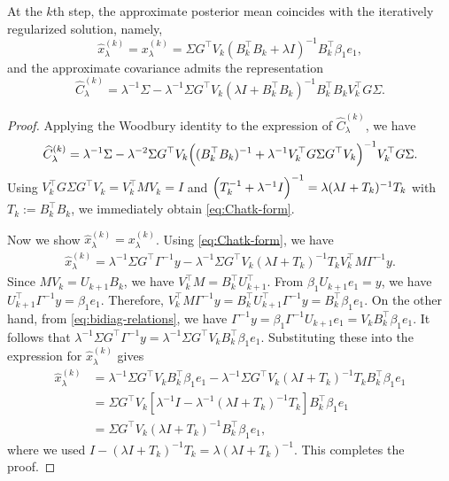 \documentclass[]{myarticle}
\begin{document}
\begin{proposition}\label{prop:approx_post}
At the $k$th step, the approximate posterior mean coincides with the iteratively regularized solution, namely,
\begin{equation}\label{eq:xhatk-form}
  \widehat{x}_{\lambda}^{(k)} = x_{\lambda}^{(k)}
  = \Sigma G^\top V_k(B_k^\top B_k+\lambda I)^{-1}B_k^\top \beta_1 e_1,
\end{equation}
and the approximate covariance admits the representation
\begin{equation}\label{eq:Chatk-form}
  \widehat{C}_{\lambda}^{(k)}
  = \lambda^{-1}\Sigma-\lambda^{-1}\Sigma G^\top V_k(\lambda I+B_k^\top B_k)^{-1}B_k^\top B_k
  V_k^\top G\Sigma .
\end{equation}
\end{proposition}
\begin{proof}
  Applying the Woodbury identity to the expression of $\widehat{C}_{\lambda}^{(k)}$, we have 
  \[\widehat{C}_{\lambda}^{(k)} = \lambda^{-1}\Sigma-\lambda^{-2}\Sigma G^\top V_k\Bigl((B_k^\top B_k)^{-1}
  + \lambda^{-1}V_k^\top G\Sigma G^\top V_k\Bigr)^{-1}V_k^\top G\Sigma .\]
  Using $V_k^\top G\Sigma G^\top V_k = V_k^\top M V_k =I$ and $\Bigl(T_{k}^{-1} +\lambda^{-1}I\Bigr)^{-1} = \lambda(\lambda I+T_{k})^{-1}T_{k}$ with $T_{k}:=B_k^\top B_k$, we immediately obtain \cref{eq:Chatk-form}.

  Now we show $\widehat{x}_{\lambda}^{(k)}=x_{\lambda}^{(k)}$. Using \cref{eq:Chatk-form}, we have
  \begin{align*}
    \widehat{x}_{\lambda}^{(k)}
    = \lambda^{-1}\Sigma G^\top\Gamma^{-1}y-\lambda^{-1}\Sigma G^\top V_k(\lambda I+T_k)^{-1}T_kV_k^\top M\Gamma^{-1}y.
  \end{align*}
  Since $MV_k=U_{k+1}B_k$, we have $V_k^\top M = B_k^\top U_{k+1}^\top$. From $\beta_1U_{k+1}e_1=y$, we have $U_{k+1}^\top\Gamma^{-1}y=\beta_1e_1$. Therefore, $V_k^\top M\Gamma^{-1}y = B_k^\top U_{k+1}^\top\Gamma^{-1}y = B_k^\top\beta_1e_1$. On the other hand, from \cref{eq:bidiag-relations}, we have $\Gamma^{-1}y =\beta_1\Gamma^{-1}U_{k+1}e_1=V_kB_k^\top\beta_1e_1$. It follows that $\lambda^{-1}\Sigma G^\top\Gamma^{-1}y=\lambda^{-1}\Sigma G^\top V_kB_k^\top\beta_1e_1$. Substituting these into the expression for $\widehat{x}_{\lambda}^{(k)}$ gives
  \begin{align*}
    \widehat{x}_{\lambda}^{(k)}
    &= \lambda^{-1}\Sigma G^\top V_kB_k^\top\beta_1e_1-\lambda^{-1}\Sigma G^\top V_k(\lambda I+T_k)^{-1}T_kB_k^\top\beta_1e_1 \\
    &= \Sigma G^\top V_k \left[\lambda^{-1}I-\lambda^{-1}(\lambda I+T_k)^{-1}T_{k}\right]B_k^\top\beta_1e_1 \\
    &= \Sigma G^\top V_k(\lambda I+T_k)^{-1}B_k^\top\beta_1e_1,
  \end{align*}
  where we used $I-(\lambda I + T_k)^{-1}T_{k}=\lambda(\lambda I + T_{k})^{-1}$. This completes the proof.
\end{proof}
\end{document}
